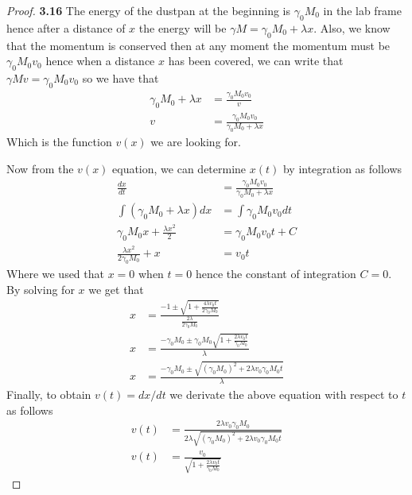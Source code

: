\documentclass[11pt]{article}
\theoremstyle{definition}
\begin{document}
\begin{proof}{\textbf{3.16}}
    The energy of the dustpan at the beginning is $\gamma_0 M_0$ in the 
    lab frame hence after a distance of $x$ the energy will be
    $\gamma M = \gamma_0 M_0 + \lambda x$. Also, we know that the momentum is
    conserved then at any moment the momentum must be $\gamma_0M_0v_0$
    hence when a distance $x$ has been covered, we can write
    that $\gamma Mv = \gamma_0M_0v_0$ so we have that
    \begin{align*}
        \gamma_0 M_0 + \lambda x &= \frac{\gamma_0 M_0 v_0}{v}\\
        v &= \frac{\gamma_0 M_0 v_0}{\gamma_0 M_0 + \lambda x}
    \end{align*}
    Which is the function $v(x)$ we are looking for.

    Now from the $v(x)$ equation, we can determine $x(t)$ by integration as follows
    \begin{align*}
        \frac{dx}{dt} &= \frac{\gamma_0 M_0 v_0}{\gamma_0 M_0 + \lambda x}\\
        \int(\gamma_0 M_0 + \lambda x)dx &= \int\gamma_0 M_0 v_0 dt\\
        \gamma_0 M_0x + \frac{\lambda x^2}{2} &= \gamma_0 M_0 v_0 t + C\\
        \frac{\lambda x^2}{2\gamma_0 M_0} + x &= v_0 t
    \end{align*}
    Where we used that $x=0$ when $t=0$ hence the constant of integration $C =0$.
    By solving for $x$ we get that
    \begin{align*}
        x &= \frac{-1\pm \sqrt{1
        + \frac{4\lambda v_0t}{2\gamma_0 M_0}}}{\frac{2\lambda}{2\gamma_0 M_0}}\\
        x &= \frac{-\gamma_0 M_0
        \pm \gamma_0 M_0\sqrt{1 + \frac{2\lambda v_0t}{\gamma_0 M_0}}}{\lambda}\\
        x &= \frac{-\gamma_0 M_0 \pm
        \sqrt{(\gamma_0 M_0)^2 + 2\lambda v_0\gamma_0 M_0 t}}{\lambda}
    \end{align*}
    Finally, to obtain $v(t) = dx/dt$ we derivate the above equation with
    respect to $t$ as follows
    \begin{align*}
        v(t) &=\frac{2\lambda v_0\gamma_0 M_0}
        {2\lambda\sqrt{(\gamma_0 M_0)^2 + 2\lambda v_0\gamma_0 M_0 t}}\\
        v(t) &=\frac{ v_0}
        {\sqrt{1 + \frac{2\lambda v_0 t}{\gamma_0 M_0}}}
    \end{align*}
\end{proof}
\end{document}
